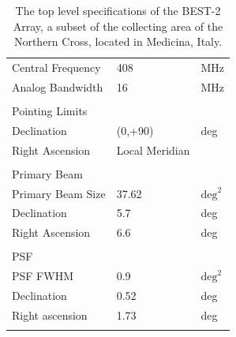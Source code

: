 \documentclass[useAMS,macros,usenatbib,onecolumn]{mn2e}
\begin{document}
\begin{table}
\begin{center}
\begin{tabular}{| l | l | l |}
\hline
Central Frequency 		&        408 &        MHz 	\\
Analog Bandwidth 		&         16 &        MHz 	\\
				&            &            	\\
\hline
Pointing Limits 		&            &            	\\
\hline
Declination 			&    (0,+90) &        deg 	\\
Right Ascension 		&    Local Meridian &  		\\
				&            &            	\\
\hline
Primary Beam 			&            &           	\\
\hline
Primary Beam Size 		&      37.62 & $\textrm{deg}^2$ \\
Declination 			&        5.7 &        deg 	\\
Right Ascension 		&        6.6 &        deg 	\\
				&            &            	\\
\hline
PSF    				&            &       		\\
\hline
PSF FWHM 			&        0.9 & $\textrm{deg}^2$ \\
Declination 			&       0.52 &     deg 		\\
Right ascension 		&       1.73 &     deg 		\\
				&            &            	\\
\hline
\end{tabular}
\caption{The top level specifications of the BEST-2 Array, a subset of the collecting area of the Northern Cross, located in Medicina, Italy.}
\label{tbl:best2}
\end{center}
\end{table}
\end{document}
